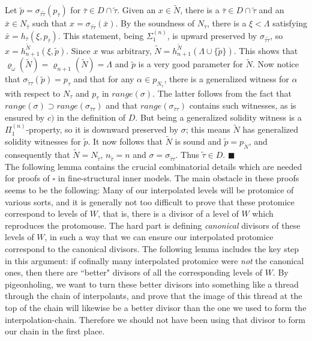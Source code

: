 \documentclass[12pt]{article}
\begin{document}
Let $\tilde{p} = \sigma_{\bar{\tau} \tilde{\tau}} (p_{\bar{\tau}})$ for $\bar{\tau} \in D \cap \tilde{\tau}$.  Given an $x \in \tilde{N}$, there is a $\bar{\tau} \in D \cap \tilde{\tau}$ and an $\bar{x} \in N_{\bar{\tau}}$ such that $x = \sigma_{\bar{\tau} \tilde{\tau}} (\bar{x})$.  By the soundness of $N_{\bar{\tau}}$, there is a $\xi < \Lambda$ satisfying $\bar{x} = h_{\bar{\tau}} ( \xi , p_{\bar{\tau}})$.  This statement, being $\Sigma_1^{(n)}$, is upward preserved by $\sigma_{\bar{\tau} \tilde{\tau}}$, so $x = h_{n+1}^{\tilde{N}} (\xi , \tilde{p})$.  Since $x$ was arbitrary, $\tilde{N} = h_{n+1}^{\tilde{N}} (\Lambda \cup \{ \tilde{p} \} )$.  This shows that $\varrho_{\omega} ( \tilde{N}) = \varrho_{n+1} ( \tilde{N}) = \Lambda$ and $\tilde{p}$ is a very good parameter for $\tilde{N}$.  Now notice that $\sigma_{\tilde{\tau} \tau} (\tilde{p}) = p_\tau$ and that for any $\alpha \in p_{N_\tau}$, there is a generalized witness for $\alpha$ with respect to $N_\tau$ and $p_\tau$ in $range (\sigma)$.  The latter follows from the fact that $range(\sigma) \supset range ( \sigma_{\bar{\tau} \tau}) $ and that $range ( \sigma_{\bar{\tau} \tau})$ contains such witnesses, as is ensured by $c)$ in the definition of $D$.  But being a generalized solidity witness is a $\Pi_1^{(n)}$-property, so it is downward preserved by $\sigma$; this means $\tilde{N}$ has generalized solidity witnesses for $\tilde{p}$.  It now follows that $\tilde{N}$ is sound and $\tilde{p} = p_{\tilde{N}}$, and consequently that $\tilde{N} = N_{\tilde{\tau}}$, $n_{\tilde{\tau}} = n$ and $\sigma = \sigma_{\tilde{\tau} \tau}$.  Thus $\tilde{\tau} \in D$. $\blacksquare$\\

The following lemma contains the crucial combinatorial details which are needed for proofs of $\square$ in fine-structural inner models.  The main obstacle in these proofs seems to be the following: Many of our interpolated levels will be protomice of various sorts, and it is generally not too difficult to prove that these protomice correspond to levels of $W$, that is, there is a divisor of a level of $W$ which reproduces the protomouse.  The hard part is defining \textit{canonical} divisors of these levels of $W$, in such a way that we can ensure our interpolated protomice correspond to the canonical divisors.  The following lemma includes the key step in this argument: if cofinally many interpolated protomice were \textit{not} the canonical ones, then there are ``better" divisors of all the corresponding levels of $W$.  By pigeonholing, we want to turn these better divisors into something like a thread through the chain of interpolants, and prove that the image of this thread at the top of the chain will likewise be a better divisor than the one we used to form the interpolation-chain.  Therefore we should not have been using that divisor to form our chain in the first place.\\
\end{document}
